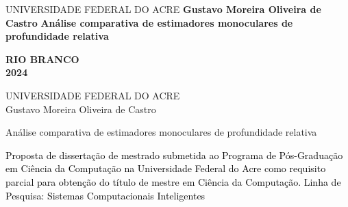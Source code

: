 	\cleardoublepage
	\thispagestyle{empty}
	
	\vspace{-60mm}
	  \begin{singlespace}
	    \begin{center}
	      {\large UNIVERSIDADE FEDERAL DO ACRE}
	      \vskip4.0cm{\textbf{\Large Gustavo Moreira Oliveira de Castro}}
	      \vskip5.0cm {\textbf{Análise comparativa de estimadores monoculares de profundidade relativa}}
	    \end{center}
	    \begin{center}
	      \vskip10.0cm{\textbf{RIO BRANCO\\2024}}
	    \end{center}
	  \end{singlespace}
	\cleardoublepage
	\thispagestyle{empty}
	
	\vspace{-60mm}
	  \begin{center}
	    {\large UNIVERSIDADE FEDERAL DO ACRE}\\
	    \vspace{3cm}
	    {\large Gustavo Moreira Oliveira de Castro} \\
	    \vspace{3cm}
	    
	    {\large Análise comparativa de estimadores monoculares de profundidade relativa} \\
	    \vspace{1.5cm}
	  \end{center}
	
	\noindent
	  \begin{flushright}
	    \begin{minipage}[t]{8cm}
	     \textcolor{black}{Proposta de dissertação de mestrado submetida ao Programa de Pós-Graduação em Ciência da Computação na Universidade Federal do Acre como requisito parcial para obtenção do título de mestre em Ciência da Computação. Linha de Pesquisa: Sistemas Computacionais Inteligentes}
	    \end{minipage}
	  \end{flushright}
	
